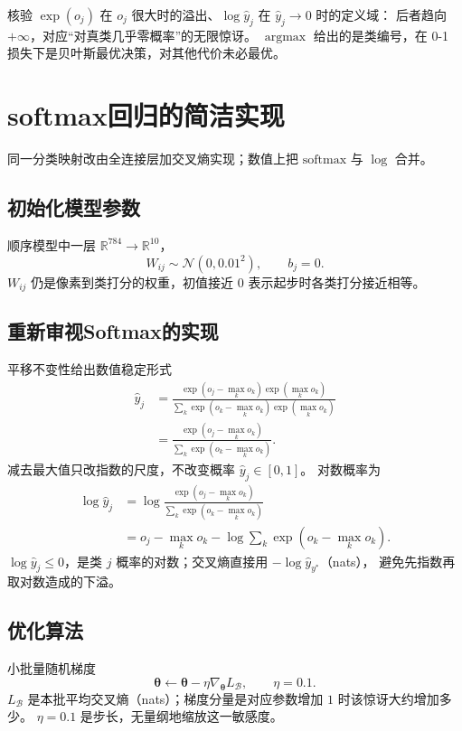 核验 $\exp(o_{j})$ 在 $o_{j}$ 很大时的溢出、$\log\hat{y}_{j}$ 在 $\hat{y}_{j}\to 0$ 时的定义域：
后者趋向 $+\infty$，对应“对真类几乎零概率”的无限惊讶。
$\operatorname*{argmax}$ 给出的是类编号，在 0-1 损失下是贝叶斯最优决策，对其他代价未必最优。

\section{softmax回归的简洁实现}

同一分类映射改由全连接层加交叉熵实现；数值上把 $\mathrm{softmax}$ 与 $\log$ 合并。

\subsection{初始化模型参数}

顺序模型中一层 $\mathbb{R}^{784}\to\mathbb{R}^{10}$，
\[
W_{ij}\sim\mathcal{N}(0,0.01^{2}),\qquad b_{j}=0.
\]
$W_{ij}$ 仍是像素到类打分的权重，初值接近 $0$ 表示起步时各类打分接近相等。

\subsection{重新审视Softmax的实现}

平移不变性给出数值稳定形式
\begin{align*}
\hat{y}_{j}
&=
\frac{\exp(o_{j}-\max_{k}o_{k})\exp(\max_{k}o_{k})}
{\sum_{k}\exp(o_{k}-\max_{k}o_{k})\exp(\max_{k}o_{k})}\\
&=
\frac{\exp(o_{j}-\max_{k}o_{k})}{\sum_{k}\exp(o_{k}-\max_{k}o_{k})}.
\end{align*}
减去最大值只改指数的尺度，不改变概率 $\hat{y}_{j}\in[0,1]$。
对数概率为
\begin{align*}
\log\hat{y}_{j}
&=
\log\frac{\exp(o_{j}-\max_{k}o_{k})}{\sum_{k}\exp(o_{k}-\max_{k}o_{k})}\\
&=
o_{j}-\max_{k}o_{k}
-\log\sum_{k}\exp(o_{k}-\max_{k}o_{k}).
\end{align*}
$\log\hat{y}_{j}\le 0$，是类 $j$ 概率的对数；交叉熵直接用 $-\log\hat{y}_{y^{\ast}}$（nats），
避免先指数再取对数造成的下溢。

\subsection{优化算法}

小批量随机梯度
\[
\bm{\theta}\leftarrow\bm{\theta}-\eta\nabla_{\bm{\theta}}L_{\mathcal{B}},
\qquad \eta=0.1.
\]
$L_{\mathcal{B}}$ 是本批平均交叉熵（nats）；梯度分量是对应参数增加 $1$ 时该惊讶大约增加多少。
$\eta=0.1$ 是步长，无量纲地缩放这一敏感度。

